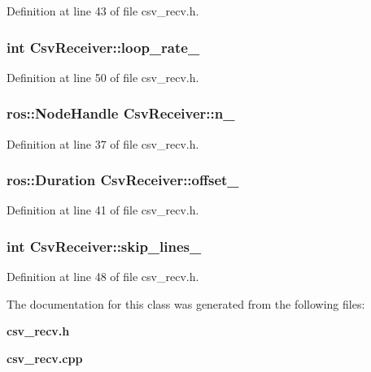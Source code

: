 \-Definition at line 43 of file csv\-\_\-recv.\-h.

\subsubsection[{loop\-\_\-rate\-\_\-}]{\setlength{\rightskip}{0pt plus 5cm}int {\bf \-Csv\-Receiver\-::loop\-\_\-rate\-\_\-}\hspace{0.3cm}{\ttfamily  [private]}}\label{classCsvReceiver_a93cff9fe0c9fb7a8454a6ec8ea1457bd}


\-Definition at line 50 of file csv\-\_\-recv.\-h.

\subsubsection[{n\-\_\-}]{\setlength{\rightskip}{0pt plus 5cm}ros\-::\-Node\-Handle {\bf \-Csv\-Receiver\-::n\-\_\-}\hspace{0.3cm}{\ttfamily  [private]}}\label{classCsvReceiver_ac305dde78f112b425572c16bf0bd3679}


\-Definition at line 37 of file csv\-\_\-recv.\-h.

\subsubsection[{offset\-\_\-}]{\setlength{\rightskip}{0pt plus 5cm}ros\-::\-Duration {\bf \-Csv\-Receiver\-::offset\-\_\-}\hspace{0.3cm}{\ttfamily  [private]}}\label{classCsvReceiver_a9790415eb601fc6b56cd84e02eb7ba8e}


\-Definition at line 41 of file csv\-\_\-recv.\-h.

\subsubsection[{skip\-\_\-lines\-\_\-}]{\setlength{\rightskip}{0pt plus 5cm}int {\bf \-Csv\-Receiver\-::skip\-\_\-lines\-\_\-}\hspace{0.3cm}{\ttfamily  [private]}}\label{classCsvReceiver_a86f7e4074bb6cf08db1e7308afe31db0}


\-Definition at line 48 of file csv\-\_\-recv.\-h.



\-The documentation for this class was generated from the following files\-:\begin{DoxyCompactItemize}
\item 
{\bf csv\-\_\-recv.\-h}\item 
{\bf csv\-\_\-recv.\-cpp}\end{DoxyCompactItemize}
